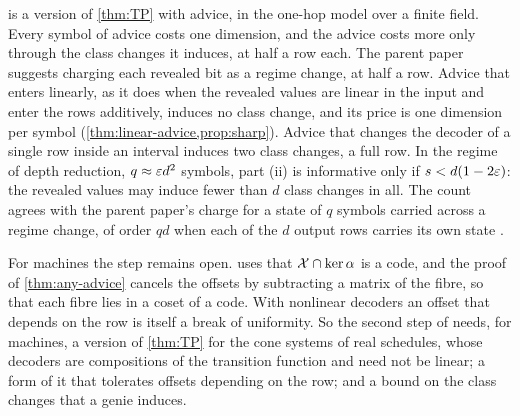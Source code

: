 \begin{remark}\label{rem:depth}
 is a version of \cref{thm:TP} with advice, in the one-hop model over a finite field. Every symbol
of advice costs one dimension, and the advice costs more only through the class changes it induces, at half a row
each. The parent paper suggests charging each revealed bit as a regime change, at half a row. Advice that enters
linearly, as it does when the revealed values are linear in the input and enter the rows additively, induces no class
change, and its price is one dimension per symbol (\cref{thm:linear-advice,prop:sharp}). Advice that changes the
decoder of a single row inside an interval induces two class changes, a full row. In the regime of depth reduction,
$q\approx\varepsilon d^2$ symbols, part (ii) is informative only if $s<d(1-2\varepsilon)$: the revealed values may induce fewer than
$d$ class changes in all. The count agrees with the parent paper's charge for a state of $q$ symbols carried across a
regime change, of order $qd$ when each of the $d$ output rows carries its own state
\cite[Section~7.2]{SeventeenthPaper2026}.

For machines the step remains open.  uses that $\mathcal{X}\cap\ker\alpha$ is a code, and the proof of
\cref{thm:any-advice} cancels the offsets by subtracting a matrix of the fibre, so that each fibre lies in a coset of a
code. With nonlinear decoders an offset that depends on the row is itself a break of uniformity. So the second step of
\cite[Section~7.4]{SeventeenthPaper2026} needs, for machines, a version of \cref{thm:TP} for the cone systems of real
schedules, whose decoders are compositions of the transition function and need not be linear; a form of it that
tolerates offsets depending on the row; and a bound on the class changes that a genie induces.
\end{remark}
